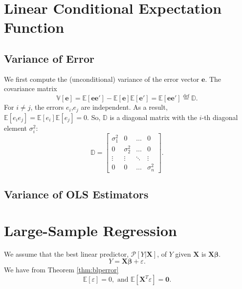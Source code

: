 \documentclass[
]{book}
\theoremstyle{definition}
\theoremstyle{definition}
\theoremstyle{definition}
\theoremstyle{definition}
\theoremstyle{remark}
\begin{document}
\hypertarget{linear-conditional-expectation-function}{%
\chapter{Linear Conditional Expectation Function}\label{linear-conditional-expectation-function}}

\hypertarget{variance-of-error}{%
\section{Variance of Error}\label{variance-of-error}}

We first compute the (unconditional) variance of the error vector \(\pmb{e}\). The covariance matrix
\[
\mathbb{V}[\pmb{e}]={\mathbb{E}\left[ \pmb{e}\pmb{e}' \right]}-{\mathbb{E}\left[ \pmb{e} \right]}{\mathbb{E}\left[ \pmb{e}' \right]}={\mathbb{E}\left[ \pmb{e}\pmb{e}' \right]}\stackrel{\text{def}}{=}\mathbb{D}.
\]
For \(i\neq j\), the errors \(e_i\),\(e_j\) are independent. As a result, \({\mathbb{E}\left[ e_ie_j \right]}={\mathbb{E}\left[ e_i \right]}{\mathbb{E}\left[ e_j \right]}=0\). So, \(\mathbb{D}\) is a diagonal matrix with the \(i\)-th diagonal element \(\sigma_i^2\):
\[
\mathbb{D}=\begin{bmatrix}
\sigma_1^2 & 0 & \ldots & 0 \\
0 & \sigma_2^2 & \ldots & 0 \\
\vdots & \vdots & \ddots & \vdots \\
0 & 0 & \ldots & \sigma_n^2
\end{bmatrix}.
\]

\hypertarget{variance-of-ols-estimators}{%
\section{Variance of OLS Estimators}\label{variance-of-ols-estimators}}

\hypertarget{large-sample-regression}{%
\chapter{Large-Sample Regression}\label{large-sample-regression}}

We assume that the best linear predictor, \(\mathscr{P}[Y|{\boldsymbol{X}}]\), of \(Y\) given \({\boldsymbol{X}}\) is \({\boldsymbol{X}}{\boldsymbol{\beta}}\).
\[
Y={\boldsymbol{X}}{\boldsymbol{\beta}}+\varepsilon.
\]
We have from Theorem \ref{thm:blperror}
\[{\mathbb{E}\left[ \varepsilon \right]}=0,\mbox{ and }{\mathbb{E}\left[ {\boldsymbol{X}}^T\varepsilon \right]}={\boldsymbol{0}}.\]
\end{document}
